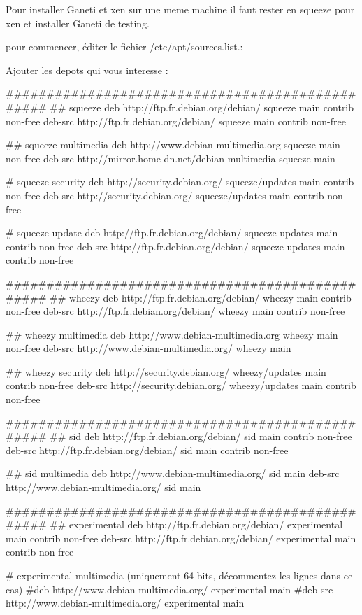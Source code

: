 
Pour installer Ganeti et xen sur une meme machine il faut rester en squeeze pour xen et installer Ganeti de testing.

pour commencer, éditer le fichier /etc/apt/sources.list.:

Ajouter les depots qui vous interesse :

################################################
## squeeze
deb http://ftp.fr.debian.org/debian/ squeeze main contrib non-free
deb-src http://ftp.fr.debian.org/debian/ squeeze main contrib non-free

## squeeze multimedia
deb http://www.debian-multimedia.org squeeze main non-free
deb-src http://mirror.home-dn.net/debian-multimedia squeeze main

# squeeze security
deb http://security.debian.org/ squeeze/updates main contrib non-free
deb-src http://security.debian.org/ squeeze/updates main contrib non-free

# squeeze update
deb http://ftp.fr.debian.org/debian/ squeeze-updates main contrib non-free
deb-src http://ftp.fr.debian.org/debian/ squeeze-updates main contrib non-free

################################################
## wheezy
deb http://ftp.fr.debian.org/debian/ wheezy main contrib non-free
deb-src http://ftp.fr.debian.org/debian/ wheezy main contrib non-free

## wheezy multimedia
deb http://www.debian-multimedia.org wheezy main non-free
deb-src http://www.debian-multimedia.org/ wheezy main

## wheezy security
deb http://security.debian.org/ wheezy/updates main contrib non-free
deb-src http://security.debian.org/ wheezy/updates main contrib non-free

################################################
## sid
deb http://ftp.fr.debian.org/debian/ sid main contrib non-free
deb-src http://ftp.fr.debian.org/debian/ sid main contrib non-free

## sid multimedia
deb http://www.debian-multimedia.org/ sid main
deb-src http://www.debian-multimedia.org/ sid main

################################################
## experimental
deb http://ftp.fr.debian.org/debian/ experimental main contrib non-free
deb-src http://ftp.fr.debian.org/debian/ experimental main contrib non-free

# experimental multimedia (uniquement 64 bits, décommentez les lignes dans ce cas)
#deb http://www.debian-multimedia.org/ experimental main
#deb-src http://www.debian-multimedia.org/ experimental main 


